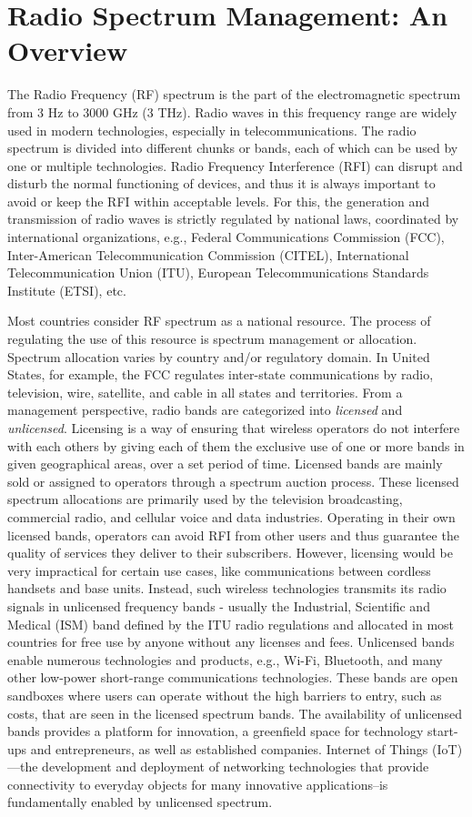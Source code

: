 \section{Radio Spectrum Management: An Overview}

The Radio Frequency (RF) spectrum is the part of the electromagnetic spectrum from $3$ Hz to $3000$ GHz ($3$ THz). Radio waves in this frequency range are widely used in modern technologies, especially in telecommunications. The radio spectrum is divided into different chunks or bands, each of which can be used by one or multiple technologies. Radio Frequency Interference (RFI) can disrupt and disturb the normal functioning of devices, and thus it is always important to avoid or keep the RFI within acceptable levels. For this, the generation and transmission of radio waves is strictly regulated by national laws, coordinated by international organizations, e.g., Federal Communications Commission (FCC), Inter-American Telecommunication Commission (CITEL), International Telecommunication Union (ITU), European Telecommunications Standards Institute (ETSI), etc. 

Most countries consider RF spectrum as a national resource. The process of regulating the use of this resource is spectrum management or allocation. Spectrum allocation varies by country and/or regulatory domain. In United States, for example, the FCC regulates inter-state communications by radio, television, wire, satellite, and cable in all states and territories. From a management perspective, radio bands are categorized into \textit{licensed} and \textit{unlicensed}. Licensing is a way of ensuring that wireless operators do not interfere with each others by giving each of them the exclusive use of one or more bands in given geographical areas, over a set period of time. Licensed bands are mainly sold or assigned to operators through  a spectrum auction process. These licensed spectrum allocations are primarily used by the television broadcasting, commercial radio, and cellular voice and data industries. Operating in their own licensed bands, operators can avoid RFI from other users and thus guarantee the quality of services they deliver to their subscribers. However, licensing would be very impractical for certain use cases, like communications between cordless handsets and base units. Instead, such wireless technologies transmits its radio signals in unlicensed frequency bands - usually the Industrial, Scientific and Medical (ISM) band defined by the ITU radio regulations and allocated in most countries for free use by anyone without any licenses and fees. Unlicensed bands enable numerous technologies and products, e.g., Wi-Fi, Bluetooth, and many other low-power short-range communications technologies. These bands are open sandboxes where users can operate without the high barriers to entry, such as costs, that are seen in the licensed spectrum bands. The availability of unlicensed bands provides a platform for innovation, a greenfield space for technology start-ups and entrepreneurs, as well as established companies. Internet of Things (IoT)---the development and deployment of networking technologies that provide connectivity to everyday objects for many innovative applications--is fundamentally enabled by unlicensed spectrum.


